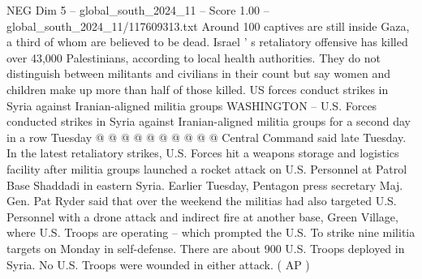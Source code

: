 \begin{textsample}{NEG Dim 5 – global\_south\_2024\_11 – Score 1.00 – global\_south\_2024\_11/117609313.txt}
Around 100 captives are still inside Gaza, a third of whom are believed to be dead.
Israel ' s retaliatory offensive has killed over 43,000 Palestinians, according to local health authorities.
They do not distinguish between militants and civilians in their count but say women and children make up more than half of those killed.
US forces conduct strikes in Syria against Iranian-aligned militia groups WASHINGTON -- U.S.
Forces conducted strikes in Syria against Iranian-aligned militia groups for a second day in a row Tuesday @ @ @ @ @ @ @ @ @ @ Central Command said late Tuesday.
In the latest retaliatory strikes, U.S.
Forces hit a weapons storage and logistics facility after militia groups launched a rocket attack on U.S.
Personnel at Patrol Base Shaddadi in eastern Syria.
Earlier Tuesday, Pentagon press secretary Maj.
Gen.
Pat Ryder said that over the weekend the militias had also targeted U.S.
Personnel with a drone attack and indirect fire at another base, Green Village, where U.S.
Troops are operating -- which prompted the U.S.
To strike nine militia targets on Monday in self-defense.
There are about 900 U.S.
Troops deployed in Syria.
No U.S.
Troops were wounded in either attack. ( AP )

\end{textsample}
